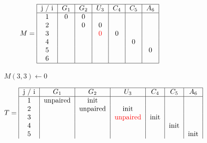 \begin{figure}[H]
    \centering
    \begin{subfigure}[t]{0.25\textwidth}
        \scriptsize \[
                        M =  \begin{tabular}{|c|c|c|c|c|c|c|}
                                 \hline
                                 j / i & $G_1$ & $G_2$ & $U_3$              & $C_4$ & $C_5$ & $A_6$ \\ \hline
                                 1     & 0     & 0     &                    &       &       &       \\
                                 2     &       & 0     & 0                  &       &       &       \\
                                 3     &       &       & \textcolor{red}{0} & 0     &       &       \\
                                 4     &       &       &                    &       & 0     &       \\
                                 5     &       &       &                    &       &       & 0     \\
                                 6     &       &       &                    &       &       &       \\ \hline
                        \end{tabular}
        \]
        \caption{$M(3,3) \gets 0$}
    \end{subfigure}
    \hfill
    \begin{subfigure}[t]{0.65\textwidth}
        \scriptsize \[
                        T =     \begin{tabular}{|c|c|c|c|c|c|c|}
                                    \hline
                                    j / i & $G_1$    & $G_2$    & $U_3$                     & $C_4$ & $C_5$ & $A_6$ \\ \hline
                                    1     & unpaired & init     &                           &       &       &       \\
                                    2     &          & unpaired & init                      &       &       &       \\
                                    3     &          &          & \textcolor{red}{unpaired} & init  &       &       \\
                                    4     &          &          &                           &       & init  &       \\
                                    5     &          &          &                           &       &       & init  \\

\end{tabular}\]
\end{subfigure}
\end{figure}

